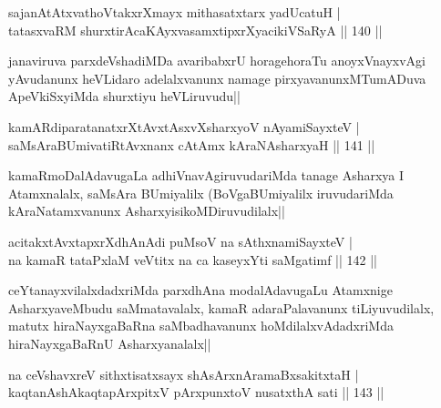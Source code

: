 
\begin{shl}
sajanAtAtxvathoVtakxrXmayx mithasatxtarx yadUcatuH |\\
tatasxvaRM shurxtirAcaKAyxvasamxtipxrXyacikiVSaRyA \hfill || 140 ||
\end{shl}

\begin{artha}
janaviruva parxdeVshadiMDa avaribabxrU horagehoraTu anoyxVnayxvAgi yAvudanunx heVLidaro 
adelalxvanunx namage pirxyavanunxMTumADuva ApeVkiSxyiMda shurxtiyu heVLiruvudu||
\end{artha}





\begin{shl}
kamARdiparatanatxrXtAvxtAsxvXsharxyoV nAyamiSayxteV |\\
saMsAraBUmivatiRtAvxnanx cA\s \s tAmx kAraNAsharxyaH \hfill || 141 ||
\end{shl}

\begin{artha}
kamaRmoDalAdavugaLa adhiVnavAgiruvudariMda tanage Asharxya I Atamxnalalx, saMsAra 
BUmiyalilx (BoVgaBUmiyalilx iruvudariMda kAraNatamxvanunx AsharxyisikoMDiruvudilalx||
\end{artha}


\begin{shl}
acitakxtAvxtapxrXdhAnAdi puMsoV na sAthxnamiSayxteV |\\
na kamaR tataPxlaM veVtitx na ca kaseyxYti saMgatimf \hfill || 142 ||
\end{shl}

\begin{artha}
ceYtanayxvilalxdadxriMda parxdhAna modalAdavugaLu Atamxnige AsharxyaveMbudu saMmatavalalx, kamaR adaraPalavanunx tiLiyuvudilalx, matutx hiraNayxgaBaRna saMbadhavanunx hoMdilalxvAdadxriMda hiraNayxgaBaRnU Asharxyanalalx||
\end{artha}


\begin{shl}
na ceVshavxreV sithxtisatxsayx shAsArxnAramaBxsakitxtaH |\\
kaqtanAshAkaqtapArxpitxV pArxpunxtoV nusatxthA sati \hfill || 143 ||
\end{shl}


